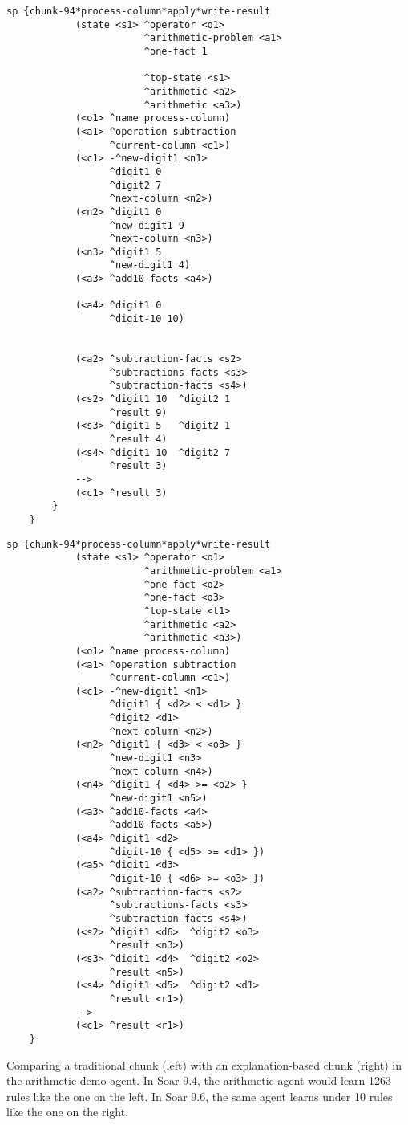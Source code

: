 \begin{table}
	\captionsetup{type=figure}
	\begin{multicols}{2}
	\begin{Verbatim}[fontsize=\tiny]
		sp {chunk-94*process-column*apply*write-result
		    (state <s1> ^operator <o1>
		                ^arithmetic-problem <a1>
		                ^one-fact 1
		
		                ^top-state <s1>
		                ^arithmetic <a2>
		                ^arithmetic <a3>)
		    (<o1> ^name process-column)
		    (<a1> ^operation subtraction
		          ^current-column <c1>)
		    (<c1> -^new-digit1 <n1>
		          ^digit1 0
		          ^digit2 7
		          ^next-column <n2>)
		    (<n2> ^digit1 0
		          ^new-digit1 9
		          ^next-column <n3>)
		    (<n3> ^digit1 5
		          ^new-digit1 4)
		    (<a3> ^add10-facts <a4>)
			
		    (<a4> ^digit1 0
		          ^digit-10 10)
		    
		    
		    (<a2> ^subtraction-facts <s2>
		          ^subtractions-facts <s3>
		          ^subtraction-facts <s4>)
		    (<s2> ^digit1 10  ^digit2 1
		          ^result 9)
		    (<s3> ^digit1 5   ^digit2 1
		          ^result 4)
		    (<s4> ^digit1 10  ^digit2 7
		          ^result 3)
		    -->
		    (<c1> ^result 3)
		}
	}
	\end{Verbatim}
	\columnbreak
	\begin{Verbatim}[fontsize=\tiny]
		sp {chunk-94*process-column*apply*write-result
		    (state <s1> ^operator <o1>
		                ^arithmetic-problem <a1>
		                ^one-fact <o2>
		                ^one-fact <o3>
		                ^top-state <t1>
		                ^arithmetic <a2>
		                ^arithmetic <a3>)
		    (<o1> ^name process-column)
		    (<a1> ^operation subtraction
		          ^current-column <c1>)
		    (<c1> -^new-digit1 <n1>
		          ^digit1 { <d2> < <d1> }
		          ^digit2 <d1>
		          ^next-column <n2>)
		    (<n2> ^digit1 { <d3> < <o3> }
		          ^new-digit1 <n3>
		          ^next-column <n4>)
		    (<n4> ^digit1 { <d4> >= <o2> }
		          ^new-digit1 <n5>)
		    (<a3> ^add10-facts <a4>
			      ^add10-facts <a5>)
		    (<a4> ^digit1 <d2>
		          ^digit-10 { <d5> >= <d1> })
		    (<a5> ^digit1 <d3>
		          ^digit-10 { <d6> >= <o3> })
		    (<a2> ^subtraction-facts <s2>
		          ^subtractions-facts <s3>
		          ^subtraction-facts <s4>)
		    (<s2> ^digit1 <d6>  ^digit2 <o3>
		          ^result <n3>)
		    (<s3> ^digit1 <d4>  ^digit2 <o2>
		          ^result <n5>)
		    (<s4> ^digit1 <d5>  ^digit2 <d1>
		          ^result <r1>)
		    -->
		    (<c1> ^result <r1>)
	}
	\end{Verbatim}
\end{multicols}
	\caption{Comparing a traditional chunk (left) with an explanation-based chunk (right) in the arithmetic demo agent.  In Soar 9.4, the arithmetic agent would learn 1263 rules like the one on the left.  In Soar 9.6, the same agent learns under 10 rules like the one on the right.}
	\label{fig:chunk-comparison}
\end{table}
